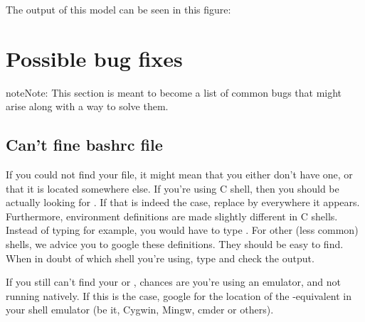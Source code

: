 \documentclass[letterpaper,10pt,openany,oneside]{sphinxmanual}
\begin{document}
The output of this model can be seen in this figure:
\label{improving:test4-time}\begin{figure}[htbp]
\centering

\noindent{}
\label{improving:test4-time}\end{figure}


\chapter{Possible bug fixes}
\label{bugs:possible-bug-fixes}\label{bugs::doc}
\begin{notice}{note}{Note:}
This section is meant to become a list of common bugs that might arise
along with a way to solve them.
\end{notice}


\section{Can't fine bashrc file}
\label{bugs:can-t-fine-bashrc-file}
If you could not find your  file, it might mean that you either
don't have one, or that it is located somewhere else. If you're using C shell,
then you should be actually looking for . If that is indeed the case,
replace  by  everywhere it appears. Furthermore, environment
definitions are made slightly different in C shells. Instead of typing  for example, you would have to type . For other (less common) shells, we advice you to google these
definitions. They should be easy to find.  When in doubt of which shell you're
using, type  and check the output.

If you still can't find your  or , chances are you're using
an emulator, and not running natively. If this is the case, google for the
location of the -equivalent in your shell emulator (be it, Cygwin,
Mingw, cmder or others).



\renewcommand{\indexname}{Index}
\printindex
\end{document}
